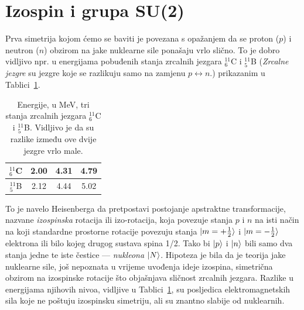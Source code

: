 \section{Izospin i grupa SU(2)}
\label{sec:izospin}
Prva simetrija kojom ćemo se baviti je povezana s opažanjem da se
proton ($p$) i neutron ($n$) obzirom na jake nuklearne
sile ponašaju vrlo slično. To je dobro vidljivo npr. u energijama
pobuđenih stanja zrcalnih jezgara $^{11}_{6}$C i $^{11}_{5}$B 
(\emph{Zrcalne jezgre} su jezgre koje se razlikuju samo na zamjenu
$p \leftrightarrow n$.) prikazanim u Tablici~\ref{tab:mirror}.
\begin{table}
\caption{\label{tab:mirror}Energije, u MeV, tri stanja zrcalnih jezgara
$^{11}_{6}$C i $^{11}_{5}$B.  Vidljivo je da su razlike između ove dvije
jezgre vrlo male.}
\begin{center}
\renewcommand{\arraystretch}{1.5}
\begin{tabular}{c|ccc}
$^{11}_{6}$C & 2.00 & 4.31 & 4.79 \\ \hline
$^{11}_{5}$B & 2.12 & 4.44 & 5.02
\end{tabular}
\renewcommand{\arraystretch}{1.0}
\end{center}
\end{table}
To je navelo Heisenberga da pretpostavi postojanje apstraktne transformacije,
nazvane \emph{izospinska} rotacija ili izo-rotacija,
koja povezuje stanja $p$ i $n$ na isti način na koji standardne prostorne rotacije
povezuju stanja $| m=+\frac{1}{2} \rangle$ i $| m=-\frac{1}{2} \rangle$
elektrona ili bilo kojeg drugog sustava spina 1/2. Tako bi $| p \rangle$ i $| n \rangle$
bili samo dva stanja jedne te iste čestice --- \emph{nukleona} $| N \rangle$.
Hipoteza je bila da je teorija jake nuklearne sile,
još nepoznata u vrijeme uvođenja ideje izospina,
simetrična obzirom na izospinske rotacije što objašnjava sličnost
zrcalnih jezgara. Razlike u energijama njihovih nivoa, vidljive u
Tablici~\ref{tab:mirror}, su posljedica elektromagnetskih sila koje
ne poštuju izospinsku simetriju, ali su znantno slabije od nuklearnih.

